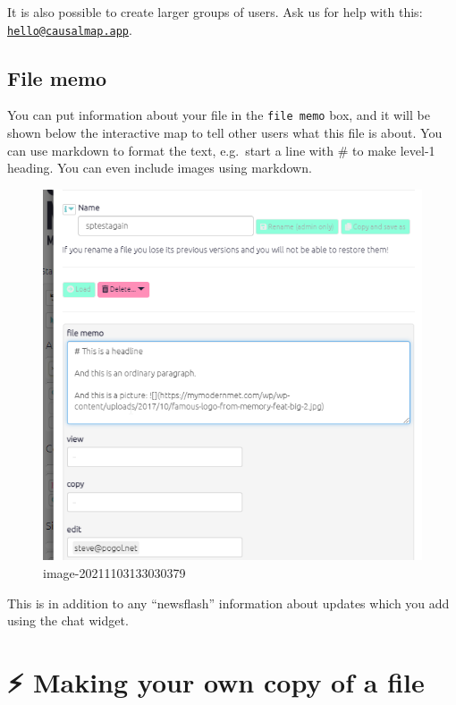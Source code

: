 \documentclass[
]{book}
\begin{document}
It is also possible to create larger groups of users. Ask us for help with this: \href{mailto:hello@causalmap.app}{\nolinkurl{hello@causalmap.app}}.

\hypertarget{file-memo}{%
\subsection{File memo}\label{file-memo}}

You can put information about your file in the \texttt{file\ memo} box, and it will be shown below the interactive map to tell other users what this file is about. You can use markdown to format the text, e.g.~start a line with \# to make level-1 heading. You can even include images using markdown.

\begin{figure}
\centering
\includegraphics{_assets/image-20211103133030379.png}
\caption{image-20211103133030379}
\end{figure}

This is in addition to any ``newsflash'' information about updates which you add using the chat widget.

\hypertarget{xown-copy}{%
\section{⚡ Making your own copy of a file}\label{xown-copy}}
\end{document}
